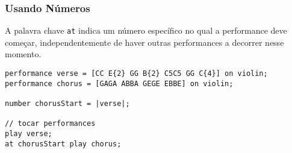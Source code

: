 \documentclass{article}
\begin{document}
\iffalse
\subsubsection{Sequencial}
A palavra chave \texttt{after} indica que uma dada performance deve começar imediatamente após o fim doutra.
\begin{lstlisting} 
// definir sequencias
sequence first_line = [CC GG AA G{2}];
sequence second_line = [FF EE DD C{2}];

// definir performances
performance first_line = twinkle on guitar;
performance second_line = twinkle_bass on guitar;

// tocar performances
play first_line;
after first_line play second_line;
\end{lstlisting}

Num exemplo mais avançado, onde a sequência de referência (no exemplo acima, \texttt{first\_line}) passada a after é tocada mais que uma vez, pode ser especificado após que performances deve a sequência alvo (no exemplo acima, \texttt{second\_line}) ser tocada. Por omissão, a sequência alvo é tocada apenas 1 vez, após a primeira reprodução da sequência de referência. 

Para obter outros comportamentos, a palavra chave \texttt{always} pode ser utilizada.

\begin{lstlisting} 
// definir sequencias
sequence first_line = [CC GG AA G{2}];
sequence second_line = [FF EE DD C{2}];

// definir performances
performance first_line = twinkle on guitar;
performance second_line = twinkle_bass on guitar;

// tocar performances
play first_line;
after first_line always play second_line;
after second_line play first_line;
// toca first_line (FL), seguido de second_line (SL), e repete uma vez, ou seja, FL, SL, FL, SL
\end{lstlisting}
\fi

\subsubsection{Usando Números}
A palavra chave \texttt{at} indica um número específico no qual a performance deve começar, independentemente de haver outras performances a decorrer nesse momento. 
\begin{lstlisting} 
performance verse = [CC E{2} GG B{2} C5C5 GG C{4}] on violin;
performance chorus = [GAGA ABBA GEGE EBBE] on violin;

number chorusStart = |verse|;

// tocar performances
play verse;
at chorusStart play chorus;
\end{lstlisting}
\end{document}
